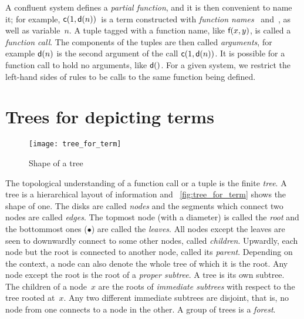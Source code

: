 A confluent system defines a \emph{partial function}, and it is then
convenient to name it; for example, \(\textsf{c}(1, \textsf{d}(n))\)~is a
term constructed with \emph{function names} ~and~, as
well as variable~\(n\). A tuple tagged with a function name, like
\(\textsf{f}(x,y)\), is called a \emph{function call}. The components of
the tuples are then called \emph{arguments}, for example
\(\textsf{d}(n)\) is the second argument of the call \(\textsf{c}(1,
\textsf{d}(n))\). It is possible for a function call to hold no
arguments, like \(\textsf{d}()\). For a given system, we restrict the
left\hyp{}hand sides of rules to be calls to the same function being
defined.

\section{Trees for depicting terms}
\label{def:tree}

%
\begin{wrapfigure}[9]{r}[0pt]{0pt}
\centering
\texttt{[image: tree\_for\_term]}%
\caption{Shape of a tree}
\label{fig:tree_for_term}
\end{wrapfigure}
The topological understanding of a function call or a tuple is the
finite \emph{tree}. A tree is a hierarchical layout of
information and \fig~\vref{fig:tree_for_term} shows the shape of
one. The disks are called \emph{nodes} and the
segments which connect two nodes are called
\emph{edges}. The topmost node (with a diameter) is
called the \emph{root} and the bottommost ones
(\(\bullet\)) are called the \emph{leaves}. All
nodes except the leaves are seen to downwardly connect to some other
nodes, called \emph{children}. Upwardly, each
node but the root is connected to another node, called its
\emph{parent}. Depending on the context, a
node can also denote the whole tree of which it is the root. Any node
except the root is the root of a \emph{proper
  subtree}. A tree is its own
subtree. The children of a node~\(x\) are the roots of \emph{immediate
  subtrees} with respect to the
tree rooted at~\(x\). Any two different immediate subtrees are
disjoint, that is, no node from one connects to a node in the other. A
group of trees is a \emph{forest}.

